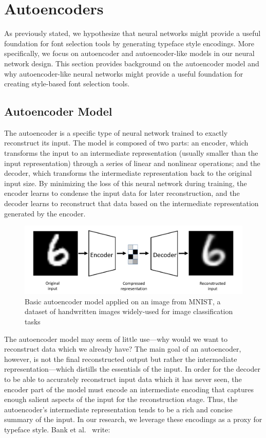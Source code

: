 \section{Autoencoders}

As previously stated, we hypothesize that neural networks might provide a useful foundation for font selection tools by generating typeface style encodings. More specifically, we focus on autoencoder and autoencoder-like models in our neural network design. This section provides background on the autoencoder model and why autoencoder-like neural networks might provide a useful foundation for creating style-based font selection tools.

\subsection{Autoencoder Model}

The autoencoder \cite{rumelhart1986} is a specific type of neural network trained to exactly reconstruct its input. The model is composed of two parts: an encoder, which transforms the input to an intermediate representation (usually smaller than the input representation) through a series of linear and nonlinear operations; and the decoder, which transforms the intermediate representation back to the original input size. By minimizing the loss of this neural network during training, the encoder learns to condense the input data for later reconstruction, and the decoder learns to reconstruct that data based on the intermediate representation generated by the encoder.

\begin{figure}[h]
    \centering
    \includegraphics[width=\textwidth]{images/autoencoder-model.png}
    \caption{Basic autoencoder model applied on an image from MNIST, a dataset of handwritten images widely-used for image classification tasks \cite{lecun1998}}
    \label{fig:autoencoder-model}
\end{figure}

The autoencoder model may seem of little use---why would we want to reconstruct data which we already have? The main goal of an autoencoder, however, is not the final reconstructed output but rather the intermediate representation---which distills the essentials of the input. In order for the decoder to be able to accurately reconstruct input data which it has never seen, the encoder part of the model must encode an intermediate encoding that captures enough salient aspects of the input for the reconstruction stage. Thus, the autoencoder's intermediate representation tends to be a rich and concise summary of the input. In our research, we leverage these encodings as a proxy for typeface style. Bank et al.\ \cite{bank2021autoencoders} write:

